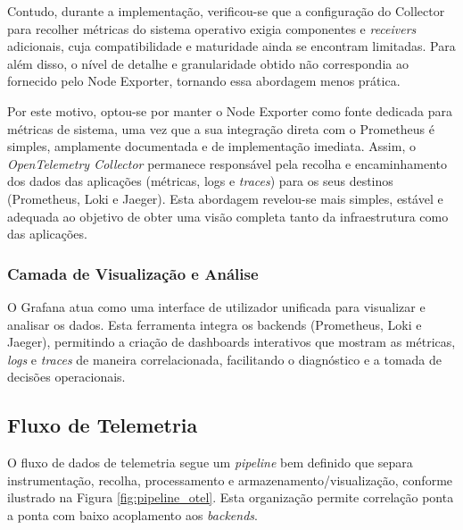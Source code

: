 Contudo, durante a implementação, verificou-se que a configuração do Collector para recolher métricas do sistema operativo exigia componentes e \textit{receivers} adicionais, cuja compatibilidade e maturidade ainda se encontram limitadas. Para além disso, o nível de detalhe e granularidade obtido não correspondia ao fornecido pelo Node Exporter, tornando essa abordagem menos prática.

Por este motivo, optou-se por manter o Node Exporter como fonte dedicada para métricas de sistema, uma vez que a sua integração direta com o Prometheus é simples, amplamente documentada e de implementação imediata. Assim, o \textit{OpenTelemetry Collector} permanece responsável pela recolha e encaminhamento dos dados das aplicações (métricas, logs e \textit{traces}) para os seus destinos (Prometheus, Loki e Jaeger). Esta abordagem revelou-se mais simples, estável e adequada ao objetivo de obter uma visão completa tanto da infraestrutura como das aplicações.


\subsubsection{Camada de Visualização e Análise}
O Grafana atua como uma interface de utilizador unificada para visualizar e analisar os dados. Esta ferramenta integra os backends (Prometheus, Loki e Jaeger), permitindo a criação de dashboards interativos que mostram as métricas, \textit{logs} e \textit{traces} de maneira correlacionada, facilitando o diagnóstico e a tomada de decisões operacionais.


\subsection{Fluxo de Telemetria}

O fluxo de dados de telemetria segue um \textit{pipeline} bem definido que separa instrumentação, recolha, processamento e armazenamento/visualização, conforme ilustrado na Figura \ref{fig:pipeline_otel}. Esta organização permite correlação ponta a ponta com baixo acoplamento aos \textit{backends}.

